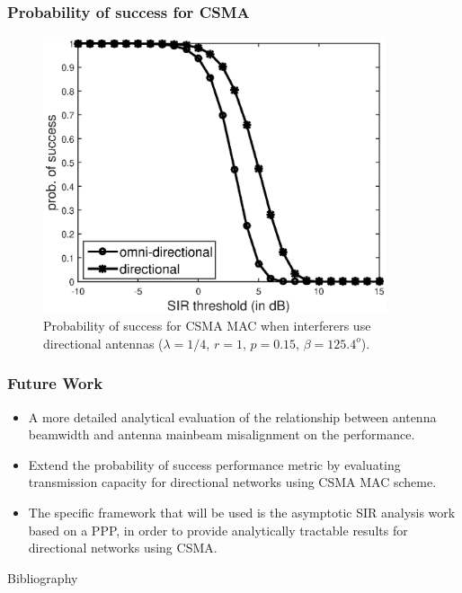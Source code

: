 \documentclass{beamer}
\begin{document}
\begin{frame}
\frametitle{\color{WPI_red} Probability of success for CSMA}

\begin{figure}
    \centering
    \includegraphics[resolution=2400, width=0.9\textwidth]{csma.eps}
    \caption{Probability of success for CSMA MAC when interferers use directional antennas ($\lambda=1/4$, $r=1$, $p=0.15$, $\beta=125.4^o$).}
\end{figure}



\end{frame}



\begin{frame}
\frametitle{\color{WPI_red} Future Work}
\begin{itemize}

\item A more detailed analytical evaluation of the relationship between antenna beamwidth and antenna mainbeam misalignment on the performance. 

\item Extend the probability of success performance metric by evaluating transmission capacity for directional networks using CSMA MAC scheme. 

\item The specific framework that will be used is the asymptotic SIR analysis work based on a PPP, in order to provide analytically tractable results for directional networks using CSMA. 
\end{itemize}

\end{frame}

\begin{frame}{Bibliography}

\end{frame}
\end{document}
